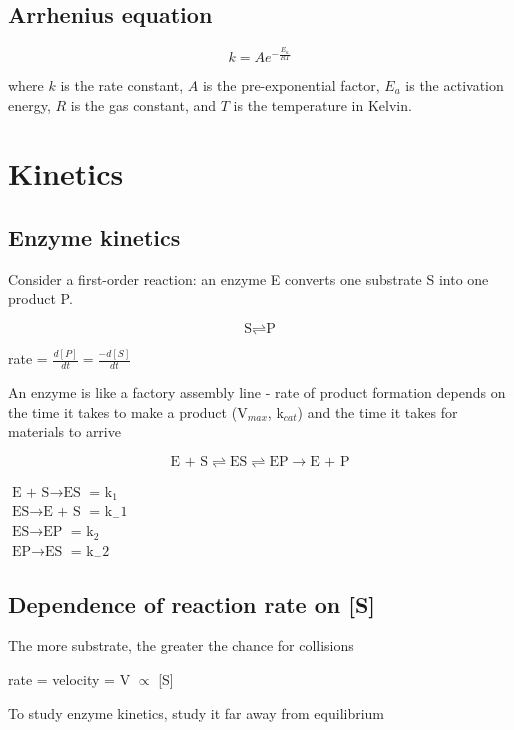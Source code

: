 \documentclass[letterpaper, 12pt]{article}
\begin{document}
\subsection*{Arrhenius equation}

\begin{equation}
k = Ae^{-\frac{E_a}{RT}}
\end{equation}

where $k$ is the rate constant, $A$ is the pre-exponential factor, $E_a$ is the activation energy, $R$ is the gas constant, and $T$ is the temperature in Kelvin.

\newpage

\section*{Kinetics}

\subsection*{Enzyme kinetics}

Consider a first-order reaction: an enzyme E converts one substrate S into one product P.

$$\text{S} \rightleftharpoons \text{P}$$

rate = $\displaystyle \frac{d[P]}{dt} = \frac{-d[S]}{dt}$

An enzyme is like a factory assembly line - rate of product formation depends on the time it takes to make a product (V$_{max}$, k$_{cat}$) and the time it takes for materials to arrive

$$ \text{E + S} \rightleftharpoons \text{ES} \rightleftharpoons \text{EP} \to \text{E + P}$$

$\text{E + S} \to \text{ES} $ = k$_1$ \\
$\text{ES} \to \text{E + S} $ = k$_-1$ \\
$\text{ES} \to \text{EP} $ = k$_2$ \\
$\text{EP} \to \text{ES} $ = k$_-2$

\subsection*{Dependence of reaction rate on [S]}

The more substrate, the greater the chance for collisions

rate = velocity = V $\propto$ [S]

To study enzyme kinetics, study it far away from equilibrium
\end{document}
